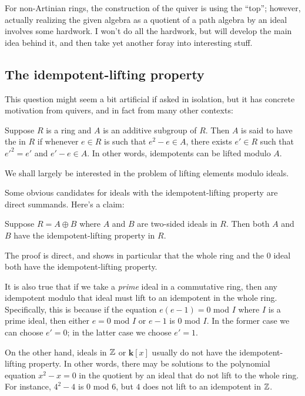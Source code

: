 \documentclass[a4paper]{amsart}
\newcommand{\field}{\mathbf{k}}
\begin{document}
For non-Artinian rings, the construction of the quiver is using the
``top''; however, actually realizing the given algebra as a quotient
of a path algebra by an ideal involves some hardwork. I won't do all
the hardwork, but will develop the main idea behind it, and then take
yet another foray into interesting stuff.

\subsection{The idempotent-lifting property}

This question might seem a bit artificial if asked in isolation, but
it has concrete motivation from quivers, and in fact from many other
contexts:

\begin{definer}
  Suppose $R$ is a ring and $A$ is an additive subgroup of $R$.  Then
  $A$ is said to have the  in
  $R$ if whenever $e \in R$ is such that $e^2 - e \in A$,
  there exists $e' \in R$ such that $e'^2 = e'$ and $e' - e \in A$.
  In other words, idempotents can be lifted modulo $A$.
\end{definer}

We shall largely be interested in the problem of lifting elements
modulo ideals.

Some obvious candidates for ideals with the idempotent-lifting property
are direct summands. Here's a claim:

\begin{claimer}
  Suppose $R = A \oplus B$ where $A$ and $B$ are two-sided ideals in $R$.
  Then both $A$ and $B$ have the idempotent-lifting property in $R$.
\end{claimer}

The proof is direct, and shows in particular that the whole ring and
the $0$ ideal both have the idempotent-lifting property. 

It is also true that if we take a {\em prime} ideal in a commutative
ring, then any idempotent modulo that ideal must lift to an idempotent
in the whole ring. Specifically, this is because if the equation
$e(e-1) = 0$ mod $I$ where $I$ is a prime ideal, then either $e = 0$
mod $I$ or $e - 1$ is $0$ mod $I$. In the former case we can choose
$e' = 0$; in the latter case we choose $e' = 1$.

On the other hand, ideals in $\mathbb{Z}$ or $\field[x]$ usually do not have
the idempotent-lifting property. In other words, there may be
solutions to the polynomial equation $x^2 - x = 0$ in the quotient by
an ideal that do not lift to the whole ring. For instance, $4^2 - 4$
is $0$ mod $6$, but $4$ does not lift to an idempotent in $\mathbb{Z}$.
\end{document}

